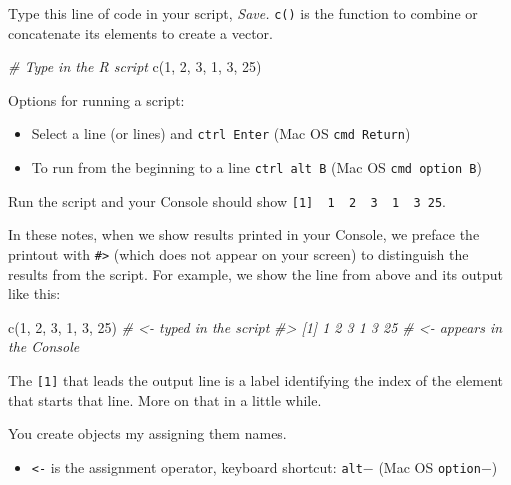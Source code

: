 \documentclass[
]{book}
\newenvironment{Shaded}{\begin{snugshade}}{\end{snugshade}}
\newcommand{\CommentTok}[1]{\textcolor[rgb]{0.56,0.35,0.01}{\textit{#1}}}
\newcommand{\DecValTok}[1]{\textcolor[rgb]{0.00,0.00,0.81}{#1}}
\newcommand{\FunctionTok}[1]{\textcolor[rgb]{0.00,0.00,0.00}{#1}}
\newcommand{\NormalTok}[1]{#1}
\providecommand{\tightlist}{%
  \setlength{\itemsep}{0pt}\setlength{\parskip}{0pt}}
\begin{document}
Type this line of code in your script, \emph{Save.} \texttt{c()} is the function to combine or concatenate its elements to create a vector.

\begin{Shaded}
\begin{Highlighting}[]
\CommentTok{\# Type in the R script}
\FunctionTok{c}\NormalTok{(}\DecValTok{1}\NormalTok{, }\DecValTok{2}\NormalTok{, }\DecValTok{3}\NormalTok{, }\DecValTok{1}\NormalTok{, }\DecValTok{3}\NormalTok{, }\DecValTok{25}\NormalTok{)}
\end{Highlighting}
\end{Shaded}

Options for running a script:

\begin{itemize}
\tightlist
\item
  Select a line (or lines) and \texttt{ctrl\ Enter} (Mac OS \texttt{cmd\ Return})
\item
  To run from the beginning to a line \texttt{ctrl\ alt\ B} (Mac OS \texttt{cmd\ option\ B})
\end{itemize}

Run the script and your Console should show \texttt{{[}1{]}\ \ 1\ \ 2\ \ 3\ \ 1\ \ 3\ 25}.

In these notes, when we show results printed in your Console, we preface the printout with \texttt{\#\textgreater{}} (which does not appear on your screen) to distinguish the results from the script. For example, we show the line from above and its output like this:

\begin{Shaded}
\begin{Highlighting}[]
\FunctionTok{c}\NormalTok{(}\DecValTok{1}\NormalTok{, }\DecValTok{2}\NormalTok{, }\DecValTok{3}\NormalTok{, }\DecValTok{1}\NormalTok{, }\DecValTok{3}\NormalTok{, }\DecValTok{25}\NormalTok{)          }\CommentTok{\# \textless{}{-} typed in the script}
\CommentTok{\#\textgreater{} [1]  1  2  3  1  3 25      \# \textless{}{-} appears in the Console}
\end{Highlighting}
\end{Shaded}

The \texttt{{[}1{]}} that leads the output line is a label identifying the index of the element that starts that line. More on that in a little while.

You create objects my assigning them names.

\begin{itemize}
\tightlist
\item
  \texttt{\textless{}-} is the assignment operator, keyboard shortcut: \texttt{alt}\(-\) (Mac OS \texttt{option}\(-\))
\end{itemize}
\end{document}
